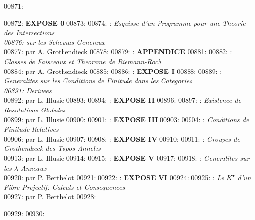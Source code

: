 00871: \begin{center}
00872: \textbf{EXPOSE 0}
00873: 
00874: : \textit{Esquisse d'un Programme pour une Theorie des Intersections\\
00876: sur les Schemas Generaux}\\
00877: par A. Grothendieck 
00878: 
00879: : \textbf{APPENDICE}
00881: 
00882: : \textit{Classes de Faisceaux et Theoreme de Riemann-Roch}\\
00884: par A. Grothendieck 
00885: 
00886: : \textbf{EXPOSE I}
00888: 
00889: : \textit{Generalites sur les Conditions de Finitude dans les Categories\\
00891: Derivees}\\
00892: par L. Illusie 
00893: 
00894: : \textbf{EXPOSE II}
00896: 
00897: : \textit{Existence de Resolutions Globales}\\
00899: par L. Illusie 
00900: 
00901: : \textbf{EXPOSE III}
00903: 
00904: : \textit{Conditions de Finitude Relatives}\\
00906: par L. Illusie 
00907: 
00908: : \textbf{EXPOSE IV}
00910: 
00911: : \textit{Groupes de Grothendieck des Topos Anneles}\\
00913: par L. Illusie 
00914: 
00915: : \textbf{EXPOSE V}
00917: 
00918: : \textit{Generalites sur les $\lambda$-Anneaux}\\
00920: par P. Berthelot 
00921: 
00922: : \textbf{EXPOSE VI}
00924: 
00925: : \textit{Le $K^{\bullet}$ d'un Fibre Projectif: Calculs et Consequences}\\
00927: par P. Berthelot 
00928: \end{center}
00929: 
00930: 
